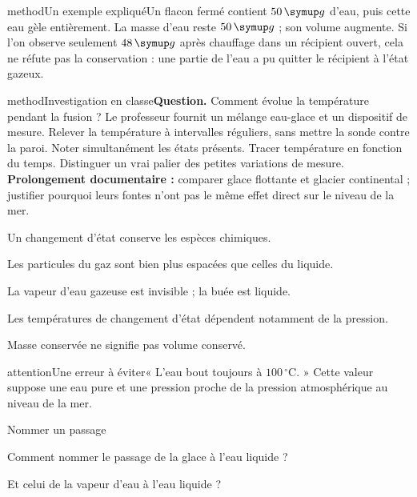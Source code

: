 \begin{pcEncadre}{method}{Un exemple expliqué}Un flacon fermé contient $50\unite g$ d’eau, puis cette eau gèle entièrement. La masse d’eau reste $50\unite g$ ; son volume augmente. Si l’on observe seulement $48\unite g$ après chauffage dans un récipient ouvert, cela ne réfute pas la conservation : une partie de l’eau a pu quitter le récipient à l’état gazeux.\end{pcEncadre}
\label{activite-3}
\begin{pcEncadre}{method}{Investigation en classe}\textbf{Question.} Comment évolue la température pendant la fusion ? Le professeur fournit un mélange eau-glace et un dispositif de mesure. Relever la température à intervalles réguliers, sans mettre la sonde contre la paroi. Noter simultanément les états présents. Tracer température en fonction du temps. Distinguer un vrai palier des petites variations de mesure. \textbf{Prolongement documentaire :} comparer glace flottante et glacier continental ; justifier pourquoi leurs fontes n’ont pas le même effet direct sur le niveau de la mer.\end{pcEncadre}
\begin{questions}
\item Un changement d’état conserve les espèces chimiques.
\item Les particules du gaz sont bien plus espacées que celles du liquide.
\item La vapeur d’eau gazeuse est invisible ; la buée est liquide.
\item Les températures de changement d’état dépendent notamment de la pression.
\item Masse conservée ne signifie pas volume conservé.
\end{questions}
\begin{pcEncadre}{attention}{Une erreur à éviter}« L’eau bout toujours à $100\,^{\circ}\mathrm C$. » Cette valeur suppose une eau pure et une pression proche de la pression atmosphérique au niveau de la mer.\end{pcEncadre}
\pcGrille
\clearpage{}
\par\noindent\begin{minipage}{\linewidth}
\begin{exercice}[1]{Nommer un passage}
\begin{questions}
\item Comment nommer le passage de la glace à l’eau liquide ?
\item Et celui de la vapeur d’eau à l’eau liquide ?
\end{questions}
\end{exercice}
\end{minipage}
